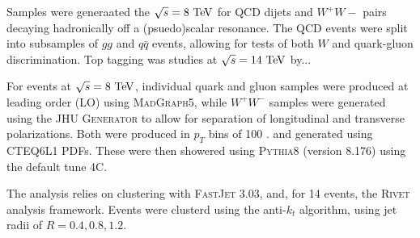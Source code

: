 Samples were generaated the $\sqrt{s} = 8\TeV$ for QCD dijets and $W^+W-$
pairs decaying hadronically off a (psuedo)scalar resonance. The QCD events
were split into subsamples of $gg$ and $q\bar{q}$ events, allowing for tests
of both $W$ and quark-gluon discrimination. Top tagging was studies at
$\sqrt{s} = 14\TeV$ by... 

For events at $\sqrt{s} = 8\TeV$, individual quark and gluon samples were
produced at leading order (LO) using \textsc{MadGraph5}, while $W^+W^-$ samples
were generated using the \textsc{JHU Generator} to allow for separation
of longitudinal and transverse polarizations. Both were produced in $p_T$
bins of 100 \TeV. and generated using \textsc{CTEQ6L1} PDFs. These were
then showered using \textsc{Pythia8} (version 8.176) using the default tune 4C.

The analysis relies on clustering with \textsc{FastJet} 3.03, and,
for 14 \TeV events, the \textsc{Rivet} analysis framework. Events were
clusterd using the anti-$k_t$ algorithm, using jet radii of $R = 0.4, 0.8, 1.2$.